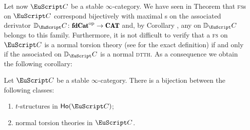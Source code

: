 Let now $\iC$ be a stable $\infty$-category. We have seen in Theorem  that \textsc{fs}s on $\iC$ correspond bijectively with maximal {\dfs}s on the associated derivator $\D_\iC\colon \fincat^\opp\to \Cat$ and, by Corollary , any \dfs on $\D_\iC$ belongs to this family. Furthermore, it is not difficult to verify that a \textsc{fs} on $\iC$ is a normal torsion theory (see \cite{Fiorenza2014} for the exact definition) if and only if the associated \dfs on $\D_\iC$ is a normal \textsc{dtth}. As a consequence we obtain the following corollary:

\begin{corollary}{\rm \cite{Fiorenza2014}}\label{infinity_rosetta}
Let $\iC$ be a stable $\infty$-category. There is a bijection between the following classes:
\begin{enumerate}
\item $t$-structures in $\ho(\iC)$; 
\item normal torsion theories in $\iC$.
\end{enumerate}
\end{corollary}
